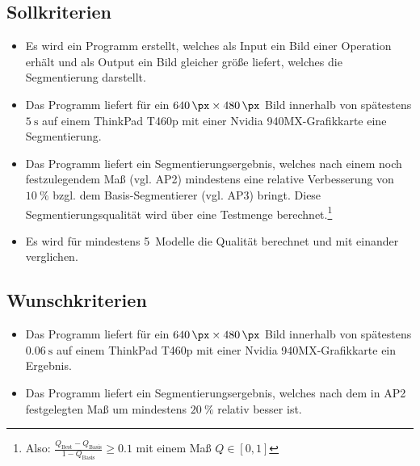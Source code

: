 \documentclass[a4paper,12pt]{article}
\begin{document}
\subsection{Sollkriterien}
\begin{itemize}
    \item Es wird ein Programm erstellt, welches als Input ein Bild einer
          Operation erhält und als Output ein Bild gleicher größe liefert,
          welches die Segmentierung darstellt.
    \item Das Programm liefert für ein $\SI{640}{\px} \times \SI{480}{\px}$
          Bild innerhalb von spätestens $\SI{5}{\second}$ auf einem
          ThinkPad T460p mit einer Nvidia 940MX-Grafikkarte eine Segmentierung.
    \item Das Programm liefert ein Segmentierungsergebnis, welches
          nach einem noch festzulegendem Maß (vgl. AP2) mindestens
          eine relative Verbesserung von $\SI{10}{\percent}$ bzgl. dem
          Basis-Segmentierer (vgl. AP3) bringt. Diese Segmentierungsqualität
          wird über eine Testmenge berechnet.\footnote{Also: $\frac{Q_\text{Best} - Q_\text{Basis}}{1-Q_\text{Basis}} \geq 0.1$ mit einem Maß $Q \in [0, 1]$}
    \item Es wird für mindestens 5~Modelle die Qualität berechnet und mit
          einander verglichen.
\end{itemize}

\subsection{Wunschkriterien}
\begin{itemize}
    \item Das Programm liefert für ein $\SI{640}{\px} \times \SI{480}{\px}$
          Bild innerhalb von spätestens $\SI{0.06}{\second}$ auf einem
          ThinkPad T460p mit einer Nvidia 940MX-Grafikkarte ein Ergebnis.
    \item Das Programm liefert ein Segmentierungsergebnis, welches nach dem in
          AP2 festgelegten Maß um mindestens $\SI{20}{\percent}$ relativ besser
          ist.
\end{itemize}
\clearpage



\clearpage



\end{document}
